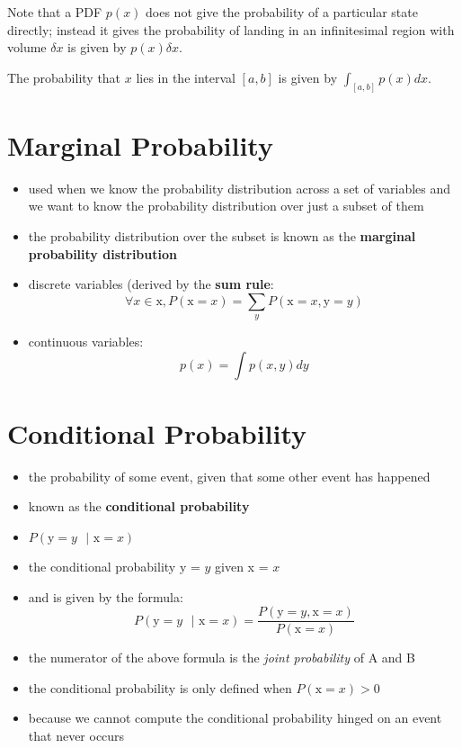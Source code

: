 \documentclass[11pt, twocolumn]{report}
\begin{document}
Note that a PDF $p(x)$ does not give the probability of a particular state
directly; instead it gives the probability of landing in an infinitesimal
region with volume $\delta x$ is given by $p(x)\delta x$.

The probability that $x$ lies in the interval $[a, b]$ is given by $\int_{[a,
  b]} p(x)dx$.

\section{Marginal Probability}
\begin{itemize}
  \item used when we know the probability distribution across a set of
    variables and we want to know the probability distribution over just a
    subset of them
  \item the probability distribution over the subset is known as the
    \textbf{marginal probability distribution}
  \item discrete variables (derived by the \textbf{sum rule}:
    \begin{equation}
      \forall x \in \text{x}, P(\text{x} = x) = \sum_y P(\text{x} = x, \text{y}
      = y)
    \end{equation}
  \item continuous variables:
    \begin{equation}
      p(x) = \int p(x, y)dy
    \end{equation}
\end{itemize}

\section{Conditional Probability}
\begin{itemize}
  \item the probability of some event, given that some other event has happened
  \item known as the \textbf{conditional probability}
  \item $P(\text{y} = y \text{ } | \text{ x} = x)$
  \item the conditional probability y = $y$ given x = $x$
  \item and is given by the formula:
    \begin{equation}
      P(\text{y} = y \text{ } | \text{ x} = x) = 
      \frac{P(\text{y} = y, \text{x} = x)}{P(\text{x} = x)}
    \end{equation}
  \item the numerator of the above formula is the \textit{joint probability} of
    A and B
  \item the conditional probability is only defined when $P(\text{x} = x) > 0$
  \item because we cannot compute the conditional probability hinged on an
    event that never occurs
\end{itemize}
\end{document}
